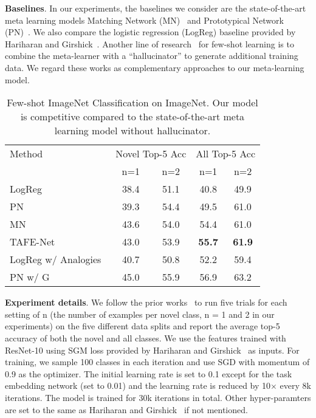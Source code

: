 \documentclass[10pt,twocolumn,letterpaper]{article}
\newcommand{\model}{TAFE-Net\xspace}
\newcommand\minisection[1]{\vspace{2mm}\noindent \textbf{#1}}
\begin{document}
\minisection{Baselines}. In our experiments, the  baselines we consider are the 
state-of-the-art meta learning models Matching Network (MN)~\cite{vinyals2016matching}
and Prototypical Network (PN)~\cite{snell2017prototypical}. We also compare the logistic regression (LogReg) baseline provided by Hariharan and Girshick~\cite{hariharan2017low}. Another line of research~\cite{wang2018low, hariharan2017low} for few-shot learning is to combine
the meta-learner with a ``hallucinator'' to generate additional training data. We
regard these works as complementary approaches to our meta-learning model. 

\begin{table}[t]
\centering
\small
\caption{Few-shot ImageNet Classification on ImageNet. Our model
is competitive compared to the state-of-the-art meta learning model
without hallucinator.}
\label{tab:few-shot}
\begin{tabular}{@{}l|cc|cc@{}}
\toprule
Method & \multicolumn{2}{c}{Novel Top-5 Acc} & \multicolumn{2}{|c}{All Top-5 Acc} \\
 & n=1 & n=2  & n=1 & n=2  \\ 
 \midrule
LogReg ~\cite{hariharan2017low} & 38.4 & 51.1  & 40.8 & 49.9 \\
PN~\cite{snell2017prototypical} & 39.3 & 54.4  &  49.5 & 61.0 \\
MN~\cite{vinyals2016matching} &  43.6 & 54.0  &  54.4 & 61.0  \\
\midrule
\model & 43.0 & 53.9 & \textbf{55.7} & \textbf{61.9} \\
\midrule\midrule
LogReg w/ Analogies~\cite{hariharan2017low} & 40.7 & 50.8 & 52.2 & 59.4 \\
PN w/ G ~\cite{wang2018low} & 45.0 & 55.9 & 56.9 & 63.2 \\ 
\bottomrule
\end{tabular}%
\vspace{-1em}
\end{table}\minisection{Experiment details}. We follow the prior works~\cite{hariharan2017low, wang2018low} to run five trials for each setting of n (the number of examples per
novel class, n = 1 and 2 in our experiments) on the five different data splits and report the average top-5 accuracy of both
the novel and all classes. We use the features trained with ResNet-10 using SGM
loss provided by Hariharan and Girshick~\cite{hariharan2017low} as inputs. 
For training, we sample 100
classes in each iteration and use SGD with momentum of 0.9 as the optimizer. The
initial learning rate is set to 0.1 except for the task embedding network (set to
0.01) and the learning rate is reduced by 10$\times$ every 8k iterations.
The model is trained for 
30k iterations in total. Other hyper-paramters are set to the same as Hariharan and Girshick~\cite{hariharan2017low} if not mentioned.
\end{document}
